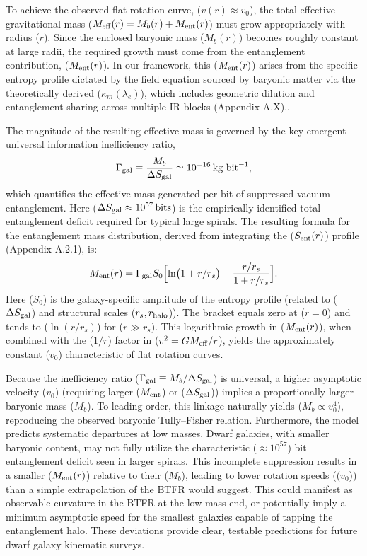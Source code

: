 \documentclass[11pt]{article}
\begin{document}
To achieve the observed flat rotation curve, ($v(r) \approx v_0$), the total effective gravitational mass ($M_{\rm eff}(r) = M_b(r) + M_{\rm ent}(r)$) must grow appropriately with radius ($r$). Since the enclosed baryonic mass ($M_b(r)$) becomes roughly constant at large radii, the required growth must come from the entanglement contribution, ($M_{\rm ent}(r)$). In our framework, this ($M_{\rm ent}(r)$) arises from the specific entropy profile dictated by the field equation sourced by baryonic matter via the theoretically derived ($\kappa_m(\lambda_e)$), which includes geometric dilution and entanglement sharing across multiple IR blocks (Appendix A.X)..

The magnitude of the resulting effective mass is governed by the key emergent universal information inefficiency ratio, 
\begin{equation*}
\Gamma_{\rm gal} \equiv \frac{M_b}{\Delta S_{\rm gal}} \simeq 10^{-16}\,\text{kg bit}^{-1}, 
\end{equation*}
which quantifies the effective mass generated per bit of suppressed vacuum entanglement. Here ($\Delta S_{\rm gal} \approx 10^{57}\,\text{bits}$) is the empirically identified total entanglement deficit required for typical large spirals. The resulting formula for the entanglement mass distribution, derived from integrating the ($S_{\rm ent}(r)$) profile (Appendix A.2.1), is: 
\begin{equation*}
M_{\rm ent}(r) = \Gamma_{\rm gal} S_0 \Bigl[ \ln\bigl(1+r/r_s\bigr) - \frac{r/r_s}{1+r/r_s} \Bigr]. 
\end{equation*}
Here ($S_0$) is the galaxy-specific amplitude of the entropy profile (related to ($\Delta S_{\rm gal}$) and structural scales ($r_s, r_{\rm halo}$)). The bracket equals zero at ($r=0$) and tends to ($\ln(r/r_s)$) for ($r \gg r_s$). This logarithmic growth in ($M_{\rm ent}(r)$), when combined with the ($1/r$) factor in ($v^2 = G M_{\rm eff}/r$), yields the approximately constant ($v_0$) characteristic of flat rotation curves.

Because the inefficiency ratio ($\Gamma_{\rm gal} \equiv M_b / \Delta S_{\rm gal}$) is universal, a higher asymptotic velocity ($v_0$) (requiring larger ($M_{\rm ent}$) or ($\Delta S_{\rm gal}$)) implies a proportionally larger baryonic mass ($M_b$). To leading order, this linkage naturally yields ($M_b \propto v_0^4$), reproducing the observed baryonic Tully–Fisher relation. Furthermore, the model predicts systematic departures at low masses. Dwarf galaxies, with smaller baryonic content, may not fully utilize the characteristic ($\approx 10^{57}$) bit entanglement deficit seen in larger spirals. This incomplete suppression results in a smaller ($M_{\rm ent}(r)$) relative to their ($M_b$), leading to lower rotation speeds (($v_0$)) than a simple extrapolation of the BTFR would suggest. This could manifest as observable curvature in the BTFR at the low-mass end, or potentially imply a minimum asymptotic speed for the smallest galaxies capable of tapping the entanglement halo. These deviations provide clear, testable predictions for future dwarf galaxy kinematic surveys.
\end{document}
